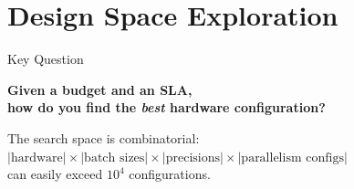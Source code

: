 \documentclass[aspectratio=169, 12pt]{beamer}
\begin{document}
\section{Design Space Exploration}

\begin{frame}{Key Question}
\begin{center}
\Large\bfseries
Given a budget and an SLA,\\[4pt]
how do you find the \emph{best} hardware configuration?
\end{center}
\vfill
\small
The search space is combinatorial:
$|\text{hardware}| \times |\text{batch sizes}| \times |\text{precisions}| \times |\text{parallelism configs}|$\\
can easily exceed $10^4$ configurations.
\end{frame}
\end{document}
